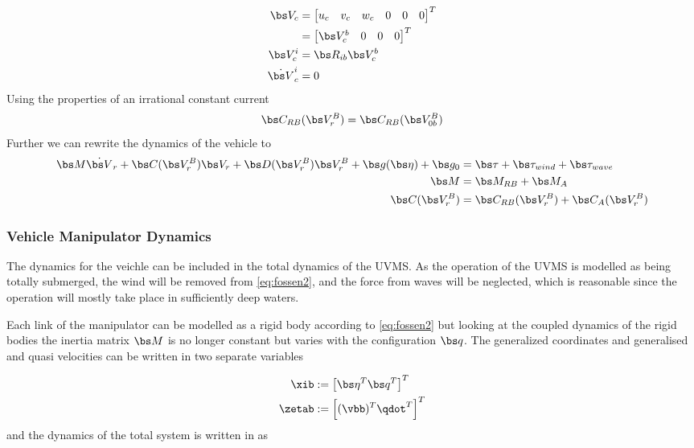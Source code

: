 \begin{align}
  \bs V_c&=\begin{bmatrix} u_c & v_c & w_c & 0 & 0 & 0\end{bmatrix}^T 
  \label{eq:current}
  \\
  &= \begin{bmatrix} \bs V_c^b & 0 & 0 & 0 \end{bmatrix}^T
  \\
  \bs V_c^i &= \bs R_{ib}\bs V_c^b 
  \\
  \dot{\bs V}_c^i&=0
\end{align}
Using the properties of an irrational constant current \cite{fs} 
\begin{align}
  \bs C_{RB}(\bs V_{r}^B) &= \bs C_{RB}(\bs V_{0b}^B) 
  \label{eq:irrational}\\
\end{align}
Further we can rewrite the dynamics of the vehicle to
\begin{align}
  \bs M \dot{\bs V}_r + \bs C(\bs V_{r}^B)\bs V_r + \bs D(\bs V_{r}^B)\bs V_{r}^B +  \bs g(\bs \eta) + \bs g_0  &= \bs \tau + \bs \tau_{wind} + \bs \tau_{wave} 
  \label{eq:fossen2}\\
  \bs M &= \bs M_{RB} + \bs M_A
  \label{eq:massCol} \\
  \bs C(\bs V_r^B) &= \bs C_{RB}(\bs V_r^B)+ \bs C_A(\bs V_r^B)
\end{align}


\subsubsection{Vehicle Manipulator Dynamics}
The dynamics for the veichle can be included in the total dynamics of the UVMS. As the operation of the UVMS is modelled as being totally submerged, the wind will be removed from \eqref{eq:fossen2}, and the force from waves will be neglected, which is reasonable since the operation will mostly take place in sufficiently deep waters.

Each link of the manipulator can be modelled as a rigid body according to \eqref{eq:fossen2} but looking at the coupled dynamics of the rigid bodies the inertia matrix $\bs M$ is no longer constant but varies with the configuration $\bs q$. The generalized coordinates and generalised and quasi velocities can be written in two separate variables

\begin{align}
  \xib  & := \left[ \bs \eta^T \bs q^T \right]^T
  \label{eq:xi} \\
  \zetab & := \left[ (\vbb)^T \qdot^T \right]^T
  \label{eq:zeta}
\end{align}
and the dynamics of the total system is written in \cite{antonelli1} as

